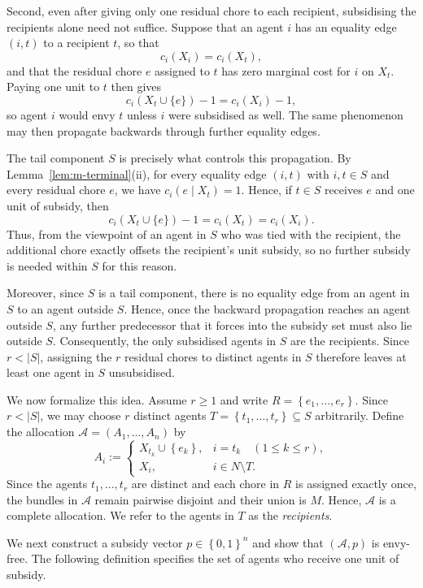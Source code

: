 \documentclass[sigconf,anonymous]{aamas}
\newcommand{\agents}{N}
\newcommand{\items}{M}
\newcommand{\alloc}{\mathcal{A}}
\newcommand{\subsidy}{p}
\newcommand{\set}[1]{\left\{#1\right\}}
\newcommand{\abs}[1]{\left\lvert#1\right\rvert}
\theoremstyle{acmplain}
\theoremstyle{acmdefinition}
\theoremstyle{acmplain}
\begin{document}
Second, even after giving only one residual chore to each recipient, subsidising the recipients alone need not suffice. Suppose that an agent $i$ has an equality edge $(i,t)$ to a recipient $t$, so that
\[
c_i(X_i)=c_i(X_t),
\]
and that the residual chore $e$ assigned to $t$ has zero marginal cost for $i$ on $X_t$. Paying one unit to $t$ then gives
\[
c_i(X_t\cup\{e\})-1
   =c_i(X_i)-1,
\]
so agent $i$ would envy $t$ unless $i$ were subsidised as well. The same phenomenon may then propagate backwards through further equality edges.

The tail component $S$ is precisely what controls this propagation. By Lemma~\ref{lem:m-terminal}(ii), for every equality edge $(i,t)$ with $i,t\in S$ and every residual chore $e$, we have $c_i(e\mid X_t)=1$. Hence, if $t\in S$ receives $e$ and one unit of subsidy, then
\[
c_i(X_t\cup\{e\})-1
   =c_i(X_t)
   =c_i(X_i).
\]
Thus, from the viewpoint of an agent in $S$ who was tied with the recipient, the additional chore exactly offsets the recipient's unit subsidy, so no further subsidy is needed within $S$ for this reason.

Moreover, since $S$ is a tail component, there is no equality edge from an agent in $S$ to an agent outside $S$. Hence, once the backward propagation reaches an agent outside $S$, any further predecessor that it forces into the subsidy set must also lie outside $S$. Consequently, the only subsidised agents in $S$ are the recipients. Since $r<|S|$, assigning the $r$ residual chores to distinct agents in $S$ therefore leaves at least one agent in $S$ unsubsidised.

We now formalize this idea. Assume $r\geq 1$ and write
\(
    R=\set{e_1,\dots,e_r}.
\) Since $r<\abs S$, we may choose $r$ distinct agents \( T=\set{t_1,\dots,t_r}\subseteq S \) arbitrarily. Define the allocation $\alloc=(A_1,\dots,A_n)$ by
\begin{equation}
\label{eq:m-alloc}
  A_i :=
  \begin{cases}
    X_{t_k}\cup\set{e_k}, & i=t_k \quad (1\leq k\leq r),\\[2pt]
    X_i, & i\in\agents\setminus T.
  \end{cases}
\end{equation}
Since the agents $t_1,\dots,t_r$ are distinct and each chore in $R$ is assigned exactly once, the bundles in $\alloc$ remain pairwise disjoint and their union is $\items$. Hence, $\alloc$ is a complete allocation. We refer to the agents in $T$ as the \emph{recipients}.

We next construct a subsidy vector $\subsidy\in\set{0,1}^n$ and show that $(\alloc,\subsidy)$ is envy-free. The following definition specifies the set of agents who receive one unit of subsidy.
\end{document}
